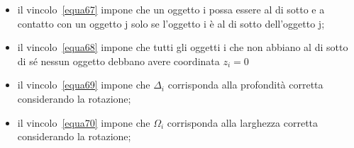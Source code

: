 \begin{itemize}
	\item il vincolo~\eqref{equa67} impone che un oggetto i possa essere al di sotto e a contatto con un oggetto j solo se l'oggetto i è al di sotto dell'oggetto j;
	\item il vincolo~\eqref{equa68} impone che tutti gli oggetti i che non abbiano al di sotto di sé nessun oggetto debbano avere coordinata $z_i=0$
	\item il vincolo~\eqref{equa69} impone che $\Delta_i$ corrisponda alla profondità corretta considerando la rotazione;
	\item il vincolo~\eqref{equa70} impone che $\Omega_i$ corrisponda alla larghezza corretta considerando la rotazione;
\end{itemize}

